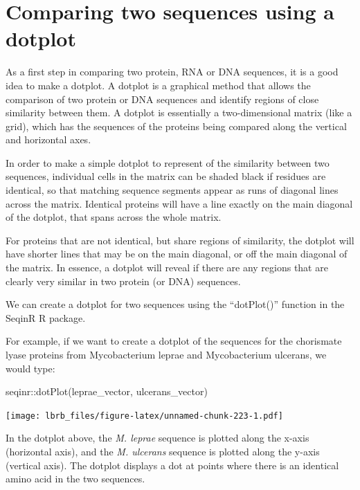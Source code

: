 \documentclass[
]{book}
\newenvironment{Shaded}{\begin{snugshade}}{\end{snugshade}}
\newcommand{\FunctionTok}[1]{\textcolor[rgb]{0.00,0.00,0.00}{#1}}
\newcommand{\NormalTok}[1]{#1}
\newcommand{\SpecialCharTok}[1]{\textcolor[rgb]{0.00,0.00,0.00}{#1}}
\begin{document}
\hypertarget{comparing-two-sequences-using-a-dotplot}{%
\section{Comparing two sequences using a dotplot}\label{comparing-two-sequences-using-a-dotplot}}

As a first step in comparing two protein, RNA or DNA sequences, it is a good idea to make a dotplot. A dotplot is a graphical method that allows the comparison of two protein or DNA sequences and identify regions of close similarity between them. A dotplot is essentially a two-dimensional matrix (like a grid), which has the sequences of the proteins being compared along the vertical and horizontal axes.

In order to make a simple dotplot to represent of the similarity between two sequences, individual cells in the matrix can be shaded black if residues are identical, so that matching sequence segments appear as runs of diagonal lines across the matrix. Identical proteins will have a line exactly on the main diagonal of the dotplot, that spans across the whole matrix.

For proteins that are not identical, but share regions of similarity, the dotplot will have shorter lines that may be on the main diagonal, or off the main diagonal of the matrix. In essence, a dotplot will reveal if there are any regions that are clearly very similar in two protein (or DNA) sequences.

We can create a dotplot for two sequences using the ``dotPlot()'' function in the SeqinR R package.

For example, if we want to create a dotplot of the sequences for the chorismate lyase proteins from Mycobacterium leprae and Mycobacterium ulcerans, we would type:

\begin{Shaded}
\begin{Highlighting}[]
\NormalTok{seqinr}\SpecialCharTok{::}\FunctionTok{dotPlot}\NormalTok{(leprae\_vector, ulcerans\_vector)}
\end{Highlighting}
\end{Shaded}

\texttt{[image: lbrb\_files/figure-latex/unnamed-chunk-223-1.pdf]}

In the dotplot above, the \emph{M. leprae} sequence is plotted along the x-axis (horizontal axis), and the \emph{M. ulcerans} sequence is plotted along the y-axis (vertical axis). The dotplot displays a dot at points where there is an identical amino acid in the two sequences.
\end{document}
